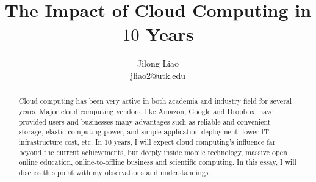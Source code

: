 \documentclass[11pt, conference, onecolumn]{IEEEtran}
\begin{document}
\title{The Impact of Cloud Computing in $10$ Years}
\author{Jilong Liao\\jliao2@utk.edu}
\maketitle

\begin{abstract}
Cloud computing has been very active in both academia and industry field for several years. Major cloud computing vendors, like Amazon, Google and Dropbox, have provided users and businesses many advantages such as reliable and convenient storage, elastic computing power, and simple application deployment, lower IT infrastructure cost, etc. In $10$ years, I will expect cloud computing's influence far beyond the current achievements, but deeply inside mobile technology, massive open online education, online-to-offline business and scientific computing. In this essay, I will discuss this point with my observations and understandings.
\end{abstract}





\end{document}
